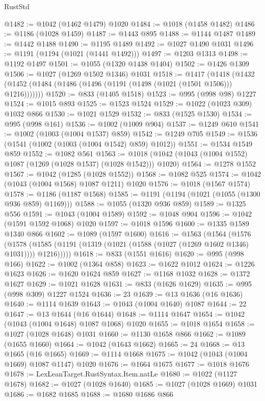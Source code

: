 \begin{lexlean}{RustStd}
\begin{coremodule}
@1482 := @1042 (@1462 @1479) @1020
@1484 := @1018 (@1458 @1482)
@1486 := @1186 (@1028 @1459)
@1487 := @1443 @895
@1488 := @1144 @1487
@1489 := @1442 @1488
@1490 := @1195 @1489
@1492 := @1027 @1490 @1031
@1496 := @1191 (@1194 (@1021 (@1441 @1492)))
@1497 := @1203 @1313
@1498 := @1192 @1497
@1501 := @1055 (@1320 @1438 @1404)
@1502 := @1426 @1309
@1506 := @1027 (@1269 @1502 @1346) @1031
@1518 := @1417
    (@1418 (@1432 (@1452 (@1484 (@1486 (@1496 (@1191 (@1498 (@1021 (@1501 @1506))) @1216)))))))
@1520 := @833 (@1405 @1518)
@1523 := @995 (@998 @98) @1227
@1524 := @1015 @893
@1525 := @1523 @1524
@1529 := @1022 (@1023 @309) @1032 @866
@1530 := @1021 @1529
@1532 := @833 (@1525 @1530)
@1534 := @995 (@998 @161)
@1536 := @1002 (@1009 @904)
@1537 := @1249 @610
@1541 := @1002 (@1003 (@1004 @1537) @859)
@1542 := @1249 @705
@1549 := @1536 (@1541 (@1002 (@1003 (@1004 @1542) @859) @1012))
@1551 := @1534 @1549 @859
@1552 := @1082 @561
@1563 := @1018 (@1042 (@1043 (@1004 @1552) @1087 (@1269 (@1028 @1537) (@1028 @1542))) @1020)
@1564 := @1278 @1552
@1567 := @1042 (@1285 (@1028 @1552))
@1568 := @1082 @525
@1574 := @1042 (@1043 (@1004 @1568) @1087 @1211) @1020
@1576 := @1018 (@1567 @1574)
@1578 := @1186 (@1187 @1568)
@1585 := @1191 (@1194 (@1021 (@1055 (@1300 @936 @859) @1169)))
@1588 := @1055 (@1320 @936 @859)
@1589 := @1325 @556
@1591 := @1043 (@1004 @1589)
@1592 := @1048 @904
@1596 := @1042 (@1591 @1592 @1068) @1020
@1597 := @1018 @1596
@1600 := @1335 @1589 @1340 @866
@1602 := @1089 (@1597 @1600)
@1616 := @1563
    (@1564
      (@1576
        (@1578 (@1585 (@1191 (@1319 (@1021 (@1588 (@1027 (@1269 @1602 @1346) @1031)))) @1216)))))
@1618 := @833 (@1551 @1616)
@1620 := @995 (@998 @166)
@1622 := @1002 (@1364 @858)
@1623 := @1622 @1012
@1624 := @1226 @1623
@1626 := @1620 @1624 @859
@1627 := @1168 @1032
@1628 := @1372 @1627
@1629 := @1021 @1628
@1631 := @833 (@1626 @1629)
@1635 := @995 (@998 @309) @1227 @1524
@1636 := 23
@1639 := @13 @1636 (@16 @1636)
@1640 := @1114 @1639
@1643 := @1043 (@1004 @1640) @1087
@1644 := 22
@1647 := @13 @1644 (@16 @1644)
@1648 := @1114 @1647
@1654 := @1042 (@1043 (@1004 @1648) @1087 @1068) @1020
@1655 := @1018 @1654
@1658 := @1027 (@1028 @1648) @1031
@1660 := @1130 @1658 @866
@1662 := @1089 (@1655 @1660)
@1664 := @1042 (@1643 @1662)
@1665 := 24
@1668 := @13 @1665 (@16 @1665)
@1669 := @1114 @1668
@1675 := @1042 (@1043 (@1004 @1669) @1087 @1147) @1020
@1676 := @1664 @1675
@1677 := @1018 @1676
@1678 := LexLeanTarget.RustSyntax.Item.natLe
@1680 := @1022 (@1127 @1678)
@1682 := @1027 (@1028 @1640)
@1685 := @1027 (@1028 @1669) @1031
@1686 := @1682 @1685
@1688 := @1680 @1686 @866

\end{coremodule}
\end{lexlean}
